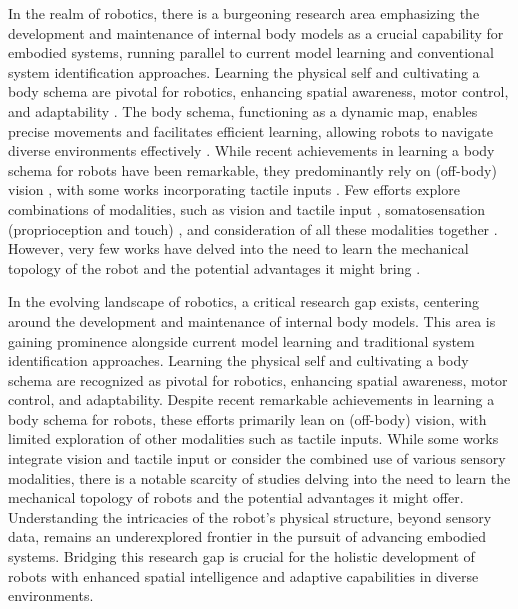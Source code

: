 \documentclass[12pt, a4paper]{article}
\begin{document}
In the realm of robotics, there is a burgeoning research area emphasizing the development and maintenance of internal body models as a crucial capability for embodied systems, running parallel to current model learning and conventional system identification approaches. Learning the physical self and cultivating a body schema are pivotal for robotics, enhancing spatial awareness, motor control, and adaptability \cite{Nguyen2021Sensorimotorrepresentationlearning}. The body schema, functioning as a dynamic map, enables precise movements and facilitates efficient learning, allowing robots to navigate diverse environments effectively \cite{Hoffmann2010Bodyschemarobotics}. While recent achievements in learning a body schema for robots have been remarkable, they predominantly rely on (off-body) vision \cite{Hersch2008Onlinelearningbody,MartinezCantin2010Bodyschemaacquisition,Hart2011roboticmodelecological,Lipson2019Taskagnosticself,Chen2022Fullybodyvisual}, with some works incorporating tactile inputs \cite{Li2015Towardsbodyschema,Zenha2018Incrementaladaptationrobot,Gama2021Goaldirectedtactile}. Few efforts explore combinations of modalities, such as vision and tactile input \cite{Fuke2007BodyImageConstructed}, somatosensation (proprioception and touch) \cite{Malinovska2022connectionistmodelassociating}, and consideration of all these modalities together \cite{Nguyen2019Reachingdevelopmentvisuo,Pugach2019BrainInspiredCoding,Lanillos2016Yieldingselfperception}. However, very few works have delved into the need to learn the mechanical topology of the robot and the potential advantages it might bring \cite{Bongard2006Automatedsynthesisbody,Bongard2006Resilientmachinescontinuous}. 

In the evolving landscape of robotics, a critical research gap exists, centering around the development and maintenance of internal body models. This area is gaining prominence alongside current model learning and traditional system identification approaches. Learning the physical self and cultivating a body schema are recognized as pivotal for robotics, enhancing spatial awareness, motor control, and adaptability. Despite recent remarkable achievements in learning a body schema for robots, these efforts primarily lean on (off-body) vision, with limited exploration of other modalities such as tactile inputs. While some works integrate vision and tactile input or consider the combined use of various sensory modalities, there is a notable scarcity of studies delving into the need to learn the mechanical topology of robots and the potential advantages it might offer. Understanding the intricacies of the robot's physical structure, beyond sensory data, remains an underexplored frontier in the pursuit of advancing embodied systems. Bridging this research gap is crucial for the holistic development of robots with enhanced spatial intelligence and adaptive capabilities in diverse environments.
\end{document}
